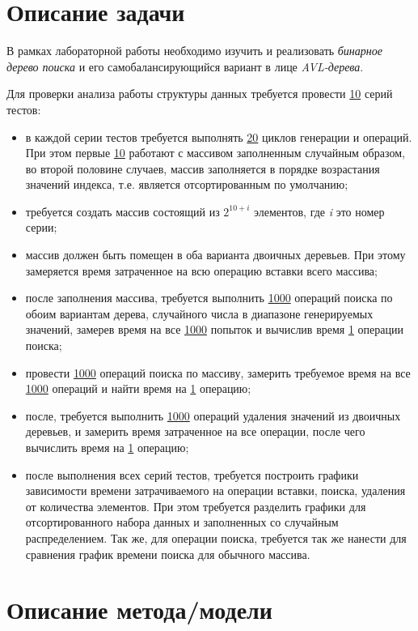 \documentclass[12pt, a4paper]{report}
\begin{document}
	\section*{Описание задачи}
	\large
	В рамках лабораторной работы необходимо изучить и реализовать \textit{бинарное дерево поиска} и его самобалансирующийся вариант в лице \textit{AVL-дерева}. \par
	Для проверки анализа работы структуры данных требуется провести \underline{10} серий тестов:
	\begin{itemize}
		\item в каждой серии тестов требуется выполнять \underline{20} циклов генерации и операций. При этом первые \underline{10} работают с массивом заполненным случайным образом, во второй половине случаев, массив заполняется в порядке возрастания значений индекса, т.е. является отсортированным по умолчанию;	
		\item требуется создать массив состоящий из \textit{$ 2^{10 + i} $} элементов, где \textit{i} это номер серии;
		\item массив должен быть помещен в оба варианта двоичных деревьев. При этому замеряется время затраченное на всю операцию вставки всего массива;
		\item после заполнения массива, требуется выполнить \underline{1000} операций поиска по обоим вариантам дерева, случайного числа в диапазоне генерируемых значений, замерев время на все \underline{1000} попыток и вычислив время \underline{1} операции поиска;
		\item провести \underline{1000} операций поиска по массиву, замерить требуемое время на все \underline{1000} операций и найти время на \underline{1} операцию;
		\item после, требуется выполнить \underline{1000} операций удаления значений из двоичных деревьев, и замерить время затраченное на все операции, после чего вычислить время на \underline{1} операцию;
		\item после выполнения всех серий тестов, требуется построить графики зависимости времени затрачиваемого на операции вставки, поиска, удаления от количества элементов. При этом требуется разделить графики для отсортированного набора данных и заполненных со случайным распределением. Так же, для операции поиска, требуется так же нанести для сравнения график времени поиска для обычного массива.
	\end{itemize}

	\newpage

	\section*{Описание метода/модели}
	\large
\end{document}
